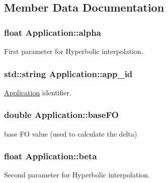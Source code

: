 \subsection{Member Data Documentation}
\hypertarget{classApplication_a087ef34a09792f2954940324dcea20d6}{
\subsubsection[{alpha}]{\setlength{\rightskip}{0pt plus 5cm}float Application\-::alpha}}\label{classApplication_a087ef34a09792f2954940324dcea20d6}


First parameter for Hyperbolic interpolation. 

\hypertarget{classApplication_a05377e6cdcb9d48f29e0f1972a4a16fe}{
\subsubsection[{app\-\_\-id}]{\setlength{\rightskip}{0pt plus 5cm}std\-::string Application\-::app\-\_\-id}}\label{classApplication_a05377e6cdcb9d48f29e0f1972a4a16fe}


\hyperlink{classApplication}{Application} identifier. 

\hypertarget{classApplication_aa703e7525d446d98b5cd51c959d35998}{
\subsubsection[{base\-F\-O}]{\setlength{\rightskip}{0pt plus 5cm}double Application\-::base\-F\-O}}\label{classApplication_aa703e7525d446d98b5cd51c959d35998}


base F\-O value (used to calculate the delta) 

\hypertarget{classApplication_a7c74ef816a425a4115005d15d01ac9c6}{
\subsubsection[{beta}]{\setlength{\rightskip}{0pt plus 5cm}float Application\-::beta}}\label{classApplication_a7c74ef816a425a4115005d15d01ac9c6}


Second parameter for Hyperbolic interpolation. 

